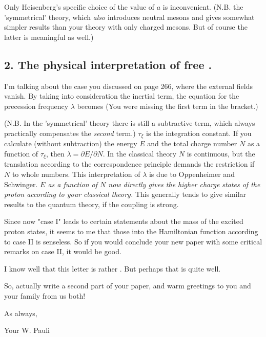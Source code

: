 Only Heisenberg's specific choice of the value of $a$ is inconvenient. (N.B. the 'symmetrical' theory, which \textit{also} introduces neutral mesons and  gives somewhat simpler results than your theory with only charged mesons. But of course the latter is meaningful as well.)

\subsection*{2. The physical interpretation of free .}

I'm talking about the case you discussed on page 266, where the external fields vanish. By taking into consideration the inertial term, the equation for the precession frequency $\lambda$ becomes
(You were missing the first term in the bracket.)

(N.B. In the 'symmetrical' theory there is still a subtractive term, which always practically compensates the \textit{second} term.) $\tau_\xi$ is the integration constant. If you calculate (without subtraction) the energy $E$ and the total charge number $N$ as a function of $\tau_\xi$, then $\lambda = \partial E/\partial N$. In the classical theory $N$ is continuous, but the translation according to the correspondence principle demands the restriction if $N$ to whole numbers. This interpretation of $\lambda$ is due to Oppenheimer and Schwinger. \textit{$E$ as a function of $N$ now directly gives the higher charge states of the proton according to your classical theory.} This generally tends to give similar results to the quantum theory, if the coupling is strong.

Since now "case I" leads to certain statements about the mass of the excited proton states, it seems to me that those  into the Hamiltonian function according to case II is senseless. So if you would conclude your new paper with some  critical remarks on case II, it would be good.

I know well that this letter is rather . But perhaps that is quite well.

So, actually write a second part of your paper, and warm greetings to you and your family from us both!

As always,

Your W. Pauli

